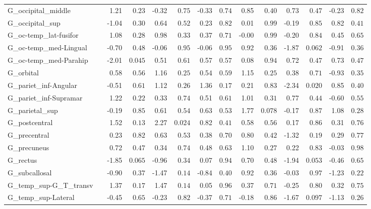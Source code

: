 {\begin{longtable}{llrrrrrrrrrrrr}
G\_occipital\_middle &  & 1.21 & $0.23$ & -0.32 & $0.75$ & -0.33 & $0.74$ & 0.85 & $0.40$ & 0.73 & $0.47$ & -0.23 & $0.82$ \\
G\_occipital\_sup &  & -1.04 & $0.30$ & 0.64 & $0.52$ & 0.23 & $0.82$ & 0.01 & $0.99$ & -0.19 & $0.85$ & 0.82 & $0.41$ \\
G\_oc-temp\_lat-fusifor &  & 1.08 & $0.28$ & 0.98 & $0.33$ & 0.37 & $0.71$ & -0.00 & $0.99$ & -0.20 & $0.84$ & 0.45 & $0.65$ \\
G\_oc-temp\_med-Lingual &  & -0.70 & $0.48$ & -0.06 & $0.95$ & -0.06 & $0.95$ & 0.92 & $0.36$ & -1.87 & $0.062$ & -0.91 & $0.36$ \\
G\_oc-temp\_med-Parahip &  & -2.01 & $0.045$ & 0.51 & $0.61$ & 0.57 & $0.57$ & 0.08 & $0.94$ & 0.72 & $0.47$ & 0.73 & $0.47$ \\
G\_orbital &  & 0.58 & $0.56$ & 1.16 & $0.25$ & 0.54 & $0.59$ & 1.15 & $0.25$ & 0.38 & $0.71$ & -0.93 & $0.35$ \\
G\_pariet\_inf-Angular &  & -0.51 & $0.61$ & 1.12 & $0.26$ & 1.36 & $0.17$ & 0.21 & $0.83$ & -2.34 & $0.020$ & 0.85 & $0.40$ \\
G\_pariet\_inf-Supramar &  & 1.22 & $0.22$ & 0.33 & $0.74$ & 0.51 & $0.61$ & 1.01 & $0.31$ & 0.77 & $0.44$ & -0.60 & $0.55$ \\
G\_parietal\_sup &  & -0.19 & $0.85$ & 0.61 & $0.54$ & 0.63 & $0.53$ & 1.77 & $0.078$ & -0.17 & $0.87$ & 1.08 & $0.28$ \\
G\_postcentral &  & 1.52 & $0.13$ & 2.27 & $0.024$ & 0.82 & $0.41$ & 0.58 & $0.56$ & 0.17 & $0.86$ & 0.31 & $0.76$ \\
G\_precentral &  & 0.23 & $0.82$ & 0.63 & $0.53$ & 0.38 & $0.70$ & 0.80 & $0.42$ & -1.32 & $0.19$ & 0.29 & $0.77$ \\
G\_precuneus &  & 0.72 & $0.47$ & 0.34 & $0.74$ & 0.48 & $0.63$ & 1.10 & $0.27$ & 0.22 & $0.83$ & -0.03 & $0.98$ \\
G\_rectus &  & -1.85 & $0.065$ & -0.96 & $0.34$ & 0.07 & $0.94$ & 0.70 & $0.48$ & -1.94 & $0.053$ & -0.46 & $0.65$ \\
G\_subcallosal &  & -0.90 & $0.37$ & -1.47 & $0.14$ & -0.84 & $0.40$ & 0.92 & $0.36$ & -0.03 & $0.97$ & -1.23 & $0.22$ \\
G\_temp\_sup-G\_T\_transv &  & 1.37 & $0.17$ & 1.47 & $0.14$ & 0.05 & $0.96$ & 0.37 & $0.71$ & -0.25 & $0.80$ & 0.32 & $0.75$ \\
G\_temp\_sup-Lateral &  & -0.45 & $0.65$ & -0.23 & $0.82$ & -0.37 & $0.71$ & -0.18 & $0.86$ & -1.67 & $0.097$ & -1.13 & $0.26$ \\

\end{longtable}}
